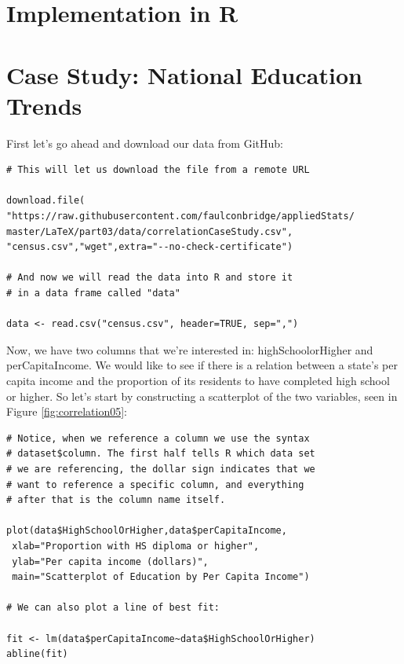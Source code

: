 \section{Implementation in R}

\section{Case Study: National Education Trends}

First let's go ahead and download our data from GitHub:

\begin{framed}
\begin{Verbatim}[samepage=TRUE]
# This will let us download the file from a remote URL

download.file(
"https://raw.githubusercontent.com/faulconbridge/appliedStats/
master/LaTeX/part03/data/correlationCaseStudy.csv",
"census.csv","wget",extra="--no-check-certificate")

# And now we will read the data into R and store it
# in a data frame called "data"

data <- read.csv("census.csv", header=TRUE, sep=",")
\end{Verbatim}
\end{framed}

Now, we have two columns that we're interested in: highSchoolorHigher and perCapitaIncome. We would like to see if there is a relation between a state's per capita income and the proportion of its residents to have completed high school or higher. So let's start by constructing a scatterplot of the two variables, seen in Figure \ref{fig:correlation05}:

\begin{framed}
\begin{Verbatim}[samepage=TRUE]
# Notice, when we reference a column we use the syntax
# dataset$column. The first half tells R which data set
# we are referencing, the dollar sign indicates that we
# want to reference a specific column, and everything
# after that is the column name itself.

plot(data$HighSchoolOrHigher,data$perCapitaIncome,
 xlab="Proportion with HS diploma or higher",
 ylab="Per capita income (dollars)",
 main="Scatterplot of Education by Per Capita Income")

# We can also plot a line of best fit:

fit <- lm(data$perCapitaIncome~data$HighSchoolOrHigher)
abline(fit)
\end{Verbatim}
\end{framed}

